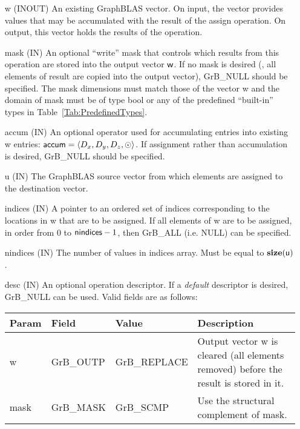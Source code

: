 \begin{itemize}[leftmargin=1in]
    \item[{\sf w}]    ({\sf INOUT}) An existing GraphBLAS vector.  On input,
    the vector provides values that may be accumulated with the result of the
    assign operation.  On output, this vector holds the results of the
    operation.

    \item[{\sf mask}]  ({\sf IN}) An optional ``write'' mask that controls which
    results from this operation are stored into the output vector
    ${\sf w}$.  If no mask is desired (\ie, all elements
    of result are copied into the output vector), {\sf GrB\_NULL}
    should be specified. The mask dimensions must match those of the
    vector {\sf w} and the domain of {\sf mask} must be
    of type {\sf bool} or any of the predefined ``built-in'' types in
    Table~\ref{Tab:PredefinedTypes}.


    \item[{\sf accum}]    ({\sf IN}) An optional operator used for accumulating
    entries into existing {\sf w} entries: ${\sf accum} = \langle D_x,
    D_y, D_z,\odot \rangle$. If assignment rather than accumulation is
    desired, {\sf GrB\_NULL} should be specified.

    \item[{\sf u}]       ({\sf IN}) The GraphBLAS source vector from which elements are assigned to the destination vector.
    
    \item[{\sf indices}]  ({\sf IN}) A pointer to an ordered set of indices 
    corresponding to the locations in {\sf w} that are to be assigned.  If all 
    elements of {\sf w} are to be assigned, in order from $0$ to 
    ${\sf nindices} - 1$, then {\sf GrB\_ALL} (i.e. NULL) can be specified.
    
    \item[{\sf nindices}] ({\sf IN}) The number of values in {\sf indices} array.
    Must be equal to $\bold{size}({\sf u})$.  

    \item[{\sf desc}]     ({\sf IN}) An optional operation descriptor.  If a 
    \emph{default} descriptor is desired, {\sf GrB\_NULL} can be used.  Valid 
    fields are as follows: \\
    
    \begin{tabular}{lllp{2.5in}}
        Param & Field  & Value & Description \\
        \hline
        {\sf w}    & {\sf GrB\_OUTP} & {\sf GrB\_REPLACE} & Output vector {\sf w}
        is cleared (all elements removed) before the result is stored in it. \\
        
        {\sf mask} & {\sf GrB\_MASK} & {\sf GrB\_SCMP}   & Use the structural 
        complement of {\sf mask}. \\
    \end{tabular}
\end{itemize}

